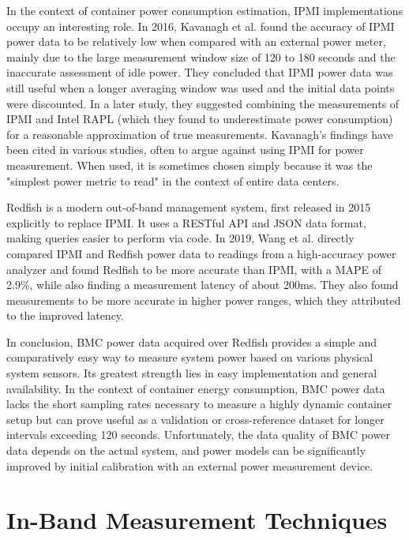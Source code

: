 In the context of container power consumption estimation, IPMI implementations occupy an interesting role. In 2016, Kavanagh et al.\parencite{kavanagh2016accuracy} found the accuracy of IPMI power data to be relatively low when compared with an external power meter, mainly due to the large measurement window size of 120 to 180 seconds and the inaccurate assessment of idle power. They concluded that IPMI power data was still useful when a longer averaging window was used and the initial data points were discounted. In a later study, they suggested combining the measurements of IPMI and Intel RAPL (which they found to underestimate power consumption) for a reasonable approximation of true measurements\parencite{kavanagh2019rapid}. Kavanagh's findings have been cited in various studies, often to argue against using IPMI for power measurement. When used, it is sometimes chosen simply because it was the "simplest power metric to read"\parencite{white2020monitoring} in the context of entire data centers.

Redfish is a modern out-of-band management system, first released in 2015 explicitly to replace IPMI\parencite{thomas-krenn-redfish}. It uses a RESTful API and JSON data format, making queries easier to perform via code. In 2019, Wang et al.\parencite{wang2019empirical} directly compared IPMI and Redfish power data to readings from a high-accuracy power analyzer and found Redfish to be more accurate than IPMI, with a MAPE of 2.9\%, while also finding a measurement latency of about 200ms. They also found measurements to be more accurate in higher power ranges, which they attributed to the improved latency.

In conclusion, BMC power data acquired over Redfish provides a simple and comparatively easy way to measure system power based on various physical system sensors. Its greatest strength lies in easy implementation and general availability. In the context of container energy consumption, BMC power data lacks the short sampling rates necessary to measure a highly dynamic container setup but can prove useful as a validation or cross-reference dataset for longer intervals exceeding 120 seconds. Unfortunately, the data quality of BMC power data depends on the actual system, and power models can be significantly improved by initial calibration with an external power measurement device\parencite{kavanagh2016accuracy}.

\section{In-Band Measurement Techniques}

